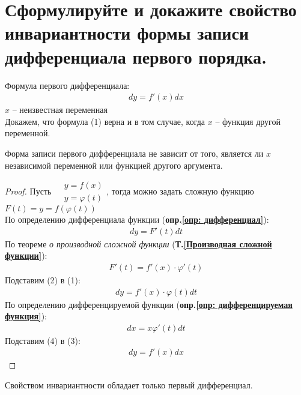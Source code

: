 \newpage
\section{Сформулируйте и докажите свойство инвариантности формы записи дифференциала первого порядка.}

Формула первого дифференциала: \vspace{-\topsep}
\begin{gather*}
  \boxed{dy = f'(x)dx} \tag{1}
\end{gather*} 
$x$ -- неизвестная переменная\\
Докажем, что формула (1) верна и в том случае, когда $x$ -- функция другой переменной.\\ \setcounter{equation}{0}
\begin{theorem}
  Форма записи первого дифференциала не зависит от того, является ли $x$ независимой переменной или функцией другого аргумента.
\end{theorem}
\begin{proof}
  Пусть $\begin{aligned}
    &y=f(x)\\
    &y=\varphi (t)
  \end{aligned}$, тогда можно задать сложную функцию $F(t) = y = f(\varphi (t))$\\
  По определению дифференциала функции (\textbf{опр.\ref{опр: дифференциал}}):
  \begin{gather}
    dy = F'(t)dt
  \end{gather} 
  По теореме \textit{о производной сложной функции} (\textbf{Т.\ref{Производная сложной функции}}):
  \begin{gather}
    F'(t) = f'(x) \cdot \varphi'(t)
  \end{gather} 
  Подставим (2) в (1): \vspace{-\topsep}
  \begin{gather}
    dy = f'(x) \cdot \varphi(t)dt
  \end{gather}
  По определению дифференцируемой функции (\textbf{опр.\ref{опр: дифференцируемая функция}}):
  \begin{gather}
    dx = x \varphi'(t)dt
  \end{gather}
  Подставим (4) в (3): \vspace{-1.5\topsep}
  \begin{gather*}
    \boxed{dy = f'(x)dx}
  \end{gather*} 
\end{proof}
\setcounter{equation}{0}
\begin{corollary}
  Свойством инвариантности обладает только первый дифференциал. 
\end{corollary} 


